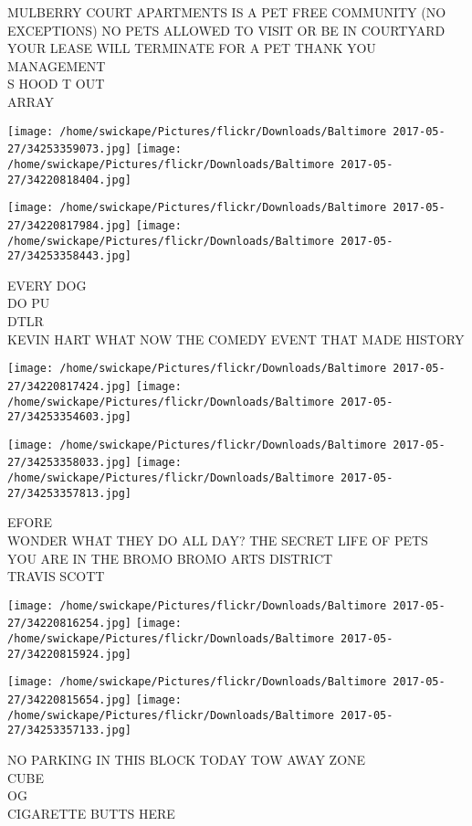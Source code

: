 \documentclass[10pt,letterpaper]{article}
\begin{document}
MULBERRY COURT APARTMENTS IS A PET FREE COMMUNITY (NO EXCEPTIONS) NO PETS ALLOWED TO VISIT OR BE IN COURTYARD YOUR LEASE WILL TERMINATE FOR A PET THANK YOU MANAGEMENT\\
S HOOD T OUT\\
ARRAY\\
\pagebreak

\texttt{[image: /home/swickape/Pictures/flickr/Downloads/Baltimore 2017-05-27/34253359073.jpg]}
\texttt{[image: /home/swickape/Pictures/flickr/Downloads/Baltimore 2017-05-27/34220818404.jpg]}

\texttt{[image: /home/swickape/Pictures/flickr/Downloads/Baltimore 2017-05-27/34220817984.jpg]}
\texttt{[image: /home/swickape/Pictures/flickr/Downloads/Baltimore 2017-05-27/34253358443.jpg]}

EVERY DOG\\
DO PU\\
DTLR\\
KEVIN HART WHAT NOW THE COMEDY EVENT THAT MADE HISTORY\\
\pagebreak

\texttt{[image: /home/swickape/Pictures/flickr/Downloads/Baltimore 2017-05-27/34220817424.jpg]}
\texttt{[image: /home/swickape/Pictures/flickr/Downloads/Baltimore 2017-05-27/34253354603.jpg]}

\texttt{[image: /home/swickape/Pictures/flickr/Downloads/Baltimore 2017-05-27/34253358033.jpg]}
\texttt{[image: /home/swickape/Pictures/flickr/Downloads/Baltimore 2017-05-27/34253357813.jpg]}

EFORE\\
WONDER WHAT THEY DO ALL DAY?  THE SECRET LIFE OF PETS\\
YOU ARE IN THE BROMO BROMO ARTS DISTRICT\\
TRAVIS SCOTT\\
\pagebreak

\texttt{[image: /home/swickape/Pictures/flickr/Downloads/Baltimore 2017-05-27/34220816254.jpg]}
\texttt{[image: /home/swickape/Pictures/flickr/Downloads/Baltimore 2017-05-27/34220815924.jpg]}

\texttt{[image: /home/swickape/Pictures/flickr/Downloads/Baltimore 2017-05-27/34220815654.jpg]}
\texttt{[image: /home/swickape/Pictures/flickr/Downloads/Baltimore 2017-05-27/34253357133.jpg]}

NO PARKING IN THIS BLOCK TODAY TOW AWAY ZONE\\
CUBE\\
OG\\
CIGARETTE BUTTS HERE\\
\pagebreak
\end{document}
